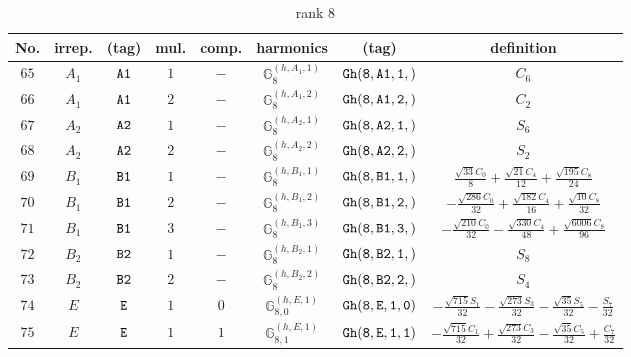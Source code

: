 \documentclass[fleqn,8pt]{jsarticle}
\begin{document}
\begin{table}[ht!]
\begin{center}
\caption{rank 8}
\renewcommand{\arraystretch}{1.3}
\begin{tabular}{cccccccc} \hline \hline
No. & irrep. & (tag) & mul. & comp. & harmonics & (tag) & definition \\ \hline
$ 65 $ & $ A_{1} $ & $ {\tt A1} $ & $ 1 $ & $ - $ & $ \mathbb{G}_{8}^{(h,A_{1},1)} $ & $ {\tt Gh(8,A1,1,)} $ & $ C_{6} $ \\
$ 66 $ & $ A_{1} $ & $ {\tt A1} $ & $ 2 $ & $ - $ & $ \mathbb{G}_{8}^{(h,A_{1},2)} $ & $ {\tt Gh(8,A1,2,)} $ & $ C_{2} $ \\
$ 67 $ & $ A_{2} $ & $ {\tt A2} $ & $ 1 $ & $ - $ & $ \mathbb{G}_{8}^{(h,A_{2},1)} $ & $ {\tt Gh(8,A2,1,)} $ & $ S_{6} $ \\
$ 68 $ & $ A_{2} $ & $ {\tt A2} $ & $ 2 $ & $ - $ & $ \mathbb{G}_{8}^{(h,A_{2},2)} $ & $ {\tt Gh(8,A2,2,)} $ & $ S_{2} $ \\
$ 69 $ & $ B_{1} $ & $ {\tt B1} $ & $ 1 $ & $ - $ & $ \mathbb{G}_{8}^{(h,B_{1},1)} $ & $ {\tt Gh(8,B1,1,)} $ & $ \frac{\sqrt{33} C_{0}}{8} + \frac{\sqrt{21} C_{4}}{12} + \frac{\sqrt{195} C_{8}}{24} $ \\
$ 70 $ & $ B_{1} $ & $ {\tt B1} $ & $ 2 $ & $ - $ & $ \mathbb{G}_{8}^{(h,B_{1},2)} $ & $ {\tt Gh(8,B1,2,)} $ & $ - \frac{\sqrt{286} C_{0}}{32} + \frac{\sqrt{182} C_{4}}{16} + \frac{\sqrt{10} C_{8}}{32} $ \\
$ 71 $ & $ B_{1} $ & $ {\tt B1} $ & $ 3 $ & $ - $ & $ \mathbb{G}_{8}^{(h,B_{1},3)} $ & $ {\tt Gh(8,B1,3,)} $ & $ - \frac{\sqrt{210} C_{0}}{32} - \frac{\sqrt{330} C_{4}}{48} + \frac{\sqrt{6006} C_{8}}{96} $ \\
$ 72 $ & $ B_{2} $ & $ {\tt B2} $ & $ 1 $ & $ - $ & $ \mathbb{G}_{8}^{(h,B_{2},1)} $ & $ {\tt Gh(8,B2,1,)} $ & $ S_{8} $ \\
$ 73 $ & $ B_{2} $ & $ {\tt B2} $ & $ 2 $ & $ - $ & $ \mathbb{G}_{8}^{(h,B_{2},2)} $ & $ {\tt Gh(8,B2,2,)} $ & $ S_{4} $ \\
$ 74 $ & $ E $ & $ {\tt E} $ & $ 1 $ & $ 0 $ & $ \mathbb{G}_{8,0}^{(h,E,1)} $ & $ {\tt Gh(8,E,1,0)} $ & $ - \frac{\sqrt{715} S_{1}}{32} - \frac{\sqrt{273} S_{3}}{32} - \frac{\sqrt{35} S_{5}}{32} - \frac{S_{7}}{32} $ \\
$ 75 $ & $ E $ & $ {\tt E} $ & $ 1 $ & $ 1 $ & $ \mathbb{G}_{8,1}^{(h,E,1)} $ & $ {\tt Gh(8,E,1,1)} $ & $ - \frac{\sqrt{715} C_{1}}{32} + \frac{\sqrt{273} C_{3}}{32} - \frac{\sqrt{35} C_{5}}{32} + \frac{C_{7}}{32} $ \\

\end{tabular}
\end{center}
\end{table}
\end{document}
